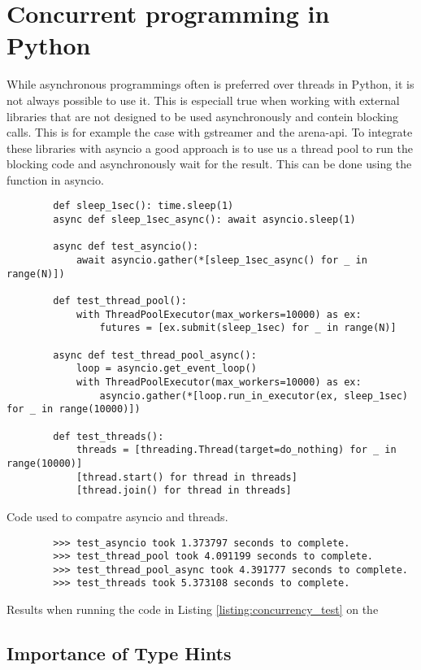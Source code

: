 \section{Concurrent programming in Python}

While asynchronous programmings often is preferred over threads in Python, it is not always possible to use it.
This is especiall true when working with external libraries that are not designed to be used asynchronously and contein blocking calls.
This is for example the case with \gls{gstreamer} and the \gls{arena-api}.
To integrate these libraries with \gls{asyncio} a good approach is to use us a thread pool to run the blocking code and asynchronously wait for the result.
This can be done using the  function in \gls{asyncio}.


\begin{listing}[H]
    \begin{verbatim}
        def sleep_1sec(): time.sleep(1)
        async def sleep_1sec_async(): await asyncio.sleep(1)

        async def test_asyncio():
            await asyncio.gather(*[sleep_1sec_async() for _ in range(N)])

        def test_thread_pool():
            with ThreadPoolExecutor(max_workers=10000) as ex:
                futures = [ex.submit(sleep_1sec) for _ in range(N)]

        async def test_thread_pool_async():
            loop = asyncio.get_event_loop()
            with ThreadPoolExecutor(max_workers=10000) as ex:
                asyncio.gather(*[loop.run_in_executor(ex, sleep_1sec) for _ in range(10000)])

        def test_threads():
            threads = [threading.Thread(target=do_nothing) for _ in range(10000)]
            [thread.start() for thread in threads]
            [thread.join() for thread in threads]
    \end{verbatim}
    \caption{Code used to compatre asyncio and threads.}
    \label{listing:concurrency_test}
\end{listing}
\begin{listing}[H]
    \begin{verbatim}
        >>> test_asyncio took 1.373797 seconds to complete.
        >>> test_thread_pool took 4.091199 seconds to complete.
        >>> test_thread_pool_async took 4.391777 seconds to complete.
        >>> test_threads took 5.373108 seconds to complete.
    \end{verbatim}
    \caption{Results when running the code in Listing  \ref{listing:concurrency_test} on the \jx}
\end{listing}

\subsection{Importance of Type Hints}
